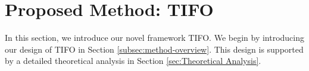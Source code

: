 \documentclass[sigconf,anonymous,review]{acmart}
\newcommand{\methodn}{\textsc{TIFO}}
\newcommand{\method}{\textsc{\methodn}\xspace}
\begin{document}





\section{Proposed Method: TIFO}

In this section, we introduce our novel framework \method. 
We begin by introducing our design of TIFO in Section \ref{subsec:method-overview}. 
This design is supported by a detailed theoretical analysis in Section \ref{sec:Theoretical Analysis}.
\end{document}
